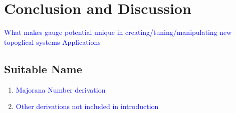 \documentclass[12pt,doctor]{thesis}
\newcommand{\Blue}[1]{\textcolor{blue}{#1}}
\begin{document}
\chapter{Conclusion and Discussion}

\Blue{What makes gauge potential unique in creating/tuning/manipulating new topoglical systems}
\Blue{Applications}

\begin{appendices}
\chapter{Suitable Name}
\begin{enumerate}
  \item \Blue{Majorana Number derivation}
  \item \Blue{Other derivations not included in introduction}
\end{enumerate}
\end{appendices}
\end{document}
